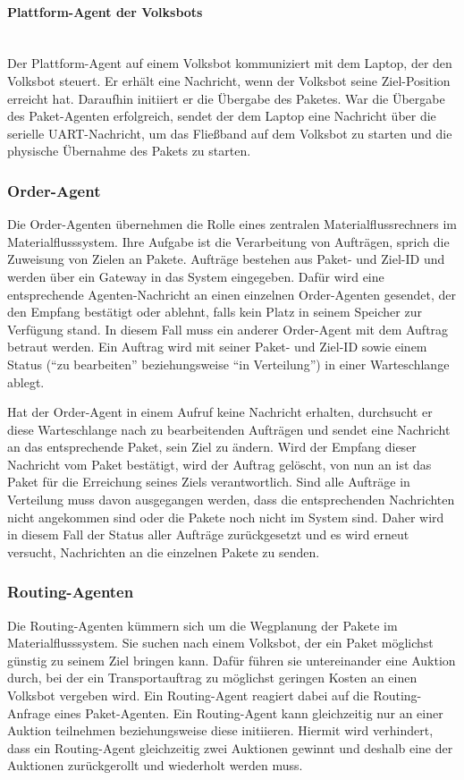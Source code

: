\paragraph{Plattform-Agent der Volksbots}\mbox{}\\
Der Plattform-Agent auf einem Volksbot kommuniziert mit dem Laptop, der den Volksbot steuert. Er erhält eine Nachricht, wenn der Volksbot seine Ziel-Position erreicht hat. Daraufhin initiiert er die Übergabe des Paketes. War die Übergabe des Paket-Agenten erfolgreich, sendet der dem Laptop eine Nachricht über die serielle UART-Nachricht, um das Fließband auf dem Volksbot zu starten und die physische Übernahme des Pakets zu starten.
\subsubsection{Order-Agent}
Die Order-Agenten übernehmen die Rolle eines zentralen Materialflussrechners im Materialflusssystem. Ihre Aufgabe ist die Verarbeitung von Aufträgen, sprich die Zuweisung von Zielen an Pakete. Aufträge bestehen aus Paket- und Ziel-ID und werden über ein Gateway in das System eingegeben. Dafür wird eine entsprechende Agenten-Nachricht an einen einzelnen Order-Agenten gesendet, der den Empfang bestätigt oder ablehnt, falls kein Platz in seinem Speicher zur Verfügung stand. In diesem Fall muss ein anderer Order-Agent mit dem Auftrag betraut werden. Ein Auftrag wird mit seiner Paket- und Ziel-ID sowie einem Status ("`zu bearbeiten"' beziehungsweise "`in Verteilung"') in einer Warteschlange ablegt.

Hat der Order-Agent in einem Aufruf keine Nachricht erhalten, durchsucht er diese Warteschlange nach zu bearbeitenden Aufträgen und sendet eine Nachricht an das entsprechende Paket, sein Ziel zu ändern. Wird der Empfang dieser Nachricht vom Paket bestätigt, wird der Auftrag gelöscht, von nun an ist das Paket für die Erreichung seines Ziels verantwortlich. Sind alle Aufträge in Verteilung muss davon ausgegangen werden, dass die entsprechenden Nachrichten nicht angekommen sind oder die Pakete noch nicht im System sind. Daher wird in diesem Fall der Status aller Aufträge zurückgesetzt und es wird erneut versucht, Nachrichten an die einzelnen Pakete zu senden.
\subsubsection{Routing-Agenten}

Die Routing-Agenten kümmern sich um die Wegplanung der Pakete im Materialflusssystem. Sie suchen nach einem Volksbot, der ein Paket möglichst günstig zu seinem Ziel bringen kann. Dafür führen sie untereinander eine Auktion durch, bei der ein Transportauftrag zu möglichst geringen Kosten an einen Volksbot vergeben wird. Ein Routing-Agent reagiert dabei auf die Routing-Anfrage eines Paket-Agenten. Ein Routing-Agent kann gleichzeitig nur an einer Auktion teilnehmen beziehungsweise diese initiieren. Hiermit wird verhindert, dass ein Routing-Agent gleichzeitig zwei Auktionen gewinnt und deshalb eine der Auktionen zurückgerollt und wiederholt werden muss.

